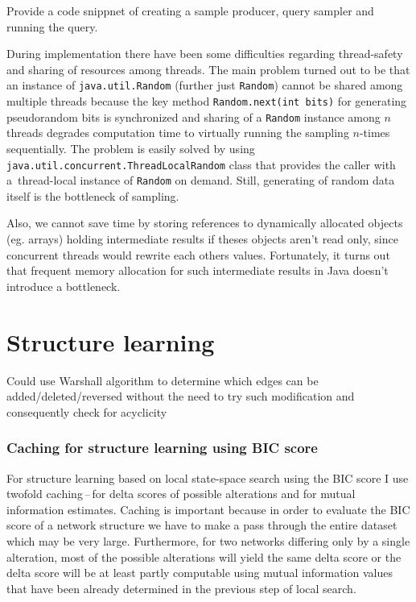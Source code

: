 \documentclass[english,cover]{fitthesis} %
\newcommand{\srccode}[1]{{\tt #1}}         %
\newcommand{\todo}[1]{{\color{red}#1}}
\begin{document}
\medskip
\todo{Provide a code snippnet of creating a sample producer, query sampler and running the query.}

\medskip
During implementation there have been some difficulties regarding thread-safety and sharing of resources among threads. The main problem turned out to be that an instance of \srccode{java.util.Random} (further just \srccode{Random}) cannot be shared among multiple threads because the key method \srccode{Random.next(int bits)} for generating pseudorandom bits is synchronized and sharing of a \srccode{Random} instance among $n$ threads degrades computation time to virtually running the sampling $n$-times sequentially. The problem is easily solved by using \srccode{java.util.concurrent.ThreadLocalRandom} class that provides the caller with a~thread-local instance of \srccode{Random} on demand. Still, generating of random data itself is the bottleneck of sampling.

Also, we cannot save time by storing references to dynamically allocated objects (eg. arrays) holding intermediate results if theses objects aren't read only, since concurrent threads would rewrite each others values. Fortunately, it turns out that frequent memory allocation for such intermediate results in Java doesn't introduce a bottleneck.







\section{Structure learning}
\todo{Could use Warshall algorithm to determine which edges can be added/deleted/reversed without the need to try such modification and consequently check for acyclicity}

\subsubsection{Caching for structure learning using BIC score}
For structure learning based on local state-space search using the BIC score I use twofold caching\,--\,for delta scores of possible alterations and for mutual information estimates. Caching is important because in order to evaluate the BIC score of a network structure we have to make a pass through the entire dataset which may be very large. Furthermore, for two networks differing only by a single alteration, most of the possible alterations will yield the same delta score or the delta score will be at least partly computable using mutual information values that have been already determined in the previous step of local search.
\end{document}
